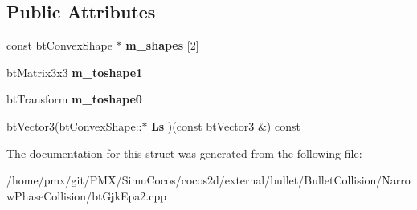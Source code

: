 \subsection*{Public Attributes}
\begin{DoxyCompactItemize}
\item 
\mbox{\label{structgjkepa2__impl_1_1MinkowskiDiff_a3d3f5a9789c7184e5adc6f81761bd2c8}} 
const bt\+Convex\+Shape $\ast$ {\bfseries m\+\_\+shapes} \mbox{[}2\mbox{]}
\item 
\mbox{\label{structgjkepa2__impl_1_1MinkowskiDiff_a6a0374ad6fc23d5fdcb4f50b7fbf457f}} 
bt\+Matrix3x3 {\bfseries m\+\_\+toshape1}
\item 
\mbox{\label{structgjkepa2__impl_1_1MinkowskiDiff_ad3b88e820bf02ad378bcf7219b6d706e}} 
bt\+Transform {\bfseries m\+\_\+toshape0}
\item 
\mbox{\label{structgjkepa2__impl_1_1MinkowskiDiff_ad16e1efe4418850c5c37e052c0048507}} 
bt\+Vector3(bt\+Convex\+Shape\+::$\ast$ {\bfseries Ls} )(const bt\+Vector3 \&) const
\end{DoxyCompactItemize}


The documentation for this struct was generated from the following file\+:\begin{DoxyCompactItemize}
\item 
/home/pmx/git/\+P\+M\+X/\+Simu\+Cocos/cocos2d/external/bullet/\+Bullet\+Collision/\+Narrow\+Phase\+Collision/bt\+Gjk\+Epa2.\+cpp\end{DoxyCompactItemize}
